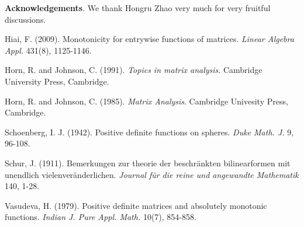 \documentclass[conference,letterpaper]{IEEEtran}
\numberwithin{equation}{section}
\begin{document}
\noindent\textbf{Acknowledgements}. We thank Hongru Zhao very much for very fruitful   discussions.


\begin{thebibliography}{99}

Hiai, F. (2009).  Monotonicity for entrywise functions of matrices. {\it Linear  Algebra  Appl.} 431(8), 1125-1146.

 Horn, R. and Johnson, C. (1991). {\em Topics in matrix analysis}. Cambridge University Press, Cambridge.


 Horn, R. and Johnson, C. (1985). {\em Matrix Analysis}. Cambridge Univesity Press, Cambridge.

Schoenberg, I. J. (1942). Positive definite functions on spheres. {\it Duke Math. J.}   9, 96-108.

Schur, J. (1911). Bemerkungen zur theorie der beschr\"{a}nkten bilinearformen mit unendlich vielenver\"{a}nderlichen. {\it Journal f\"{u}r die reine und angewandte Mathematik} 140, 1-28.

 Vasudeva, H. (1979).  Positive definite matrices and absolutely monotonic functions. {\it Indian J. Pure Appl. Math.} 10(7), 854-858.

\end{thebibliography}
\end{document}
